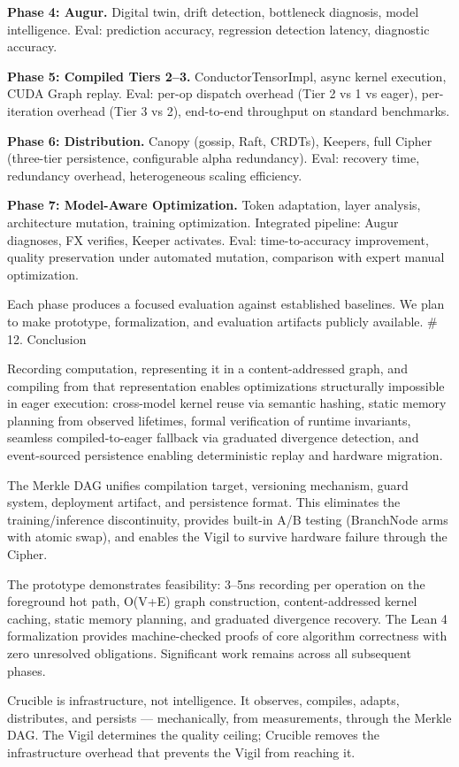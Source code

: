 \textbf{Phase 4: Augur.} Digital twin, drift detection, bottleneck diagnosis, model intelligence. Eval: prediction accuracy, regression detection latency, diagnostic accuracy.

\textbf{Phase 5: Compiled Tiers 2--3.} ConductorTensorImpl, async kernel execution, CUDA Graph replay. Eval: per-op dispatch overhead (Tier 2 vs 1 vs eager), per-iteration overhead (Tier 3 vs 2), end-to-end throughput on standard benchmarks.

\textbf{Phase 6: Distribution.} Canopy (gossip, Raft, CRDTs), Keepers, full Cipher (three-tier persistence, configurable alpha redundancy). Eval: recovery time, redundancy overhead, heterogeneous scaling efficiency.

\textbf{Phase 7: Model-Aware Optimization.} Token adaptation, layer analysis, architecture mutation, training optimization. Integrated pipeline: Augur diagnoses, FX verifies, Keeper activates. Eval: time-to-accuracy improvement, quality preservation under automated mutation, comparison with expert manual optimization.

Each phase produces a focused evaluation against established baselines. We plan to make prototype, formalization, and evaluation artifacts publicly available.
\# 12. Conclusion

Recording computation, representing it in a content-addressed graph, and compiling from that representation enables optimizations structurally impossible in eager execution: cross-model kernel reuse via semantic hashing, static memory planning from observed lifetimes, formal verification of runtime invariants, seamless compiled-to-eager fallback via graduated divergence detection, and event-sourced persistence enabling deterministic replay and hardware migration.

The Merkle DAG unifies compilation target, versioning mechanism, guard system, deployment artifact, and persistence format. This eliminates the training/inference discontinuity, provides built-in A/B testing (BranchNode arms with atomic swap), and enables the Vigil to survive hardware failure through the Cipher.

The prototype demonstrates feasibility: 3--5ns recording per operation on the foreground hot path, O(V+E) graph construction, content-addressed kernel caching, static memory planning, and graduated divergence recovery. The Lean 4 formalization provides machine-checked proofs of core algorithm correctness with zero unresolved obligations. Significant work remains across all subsequent phases.

Crucible is infrastructure, not intelligence. It observes, compiles, adapts, distributes, and persists --- mechanically, from measurements, through the Merkle DAG. The Vigil determines the quality ceiling; Crucible removes the infrastructure overhead that prevents the Vigil from reaching it.
